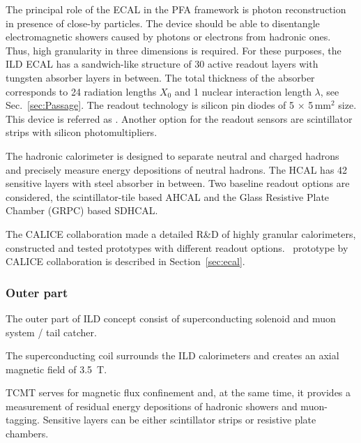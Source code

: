 The principal role of the ECAL in the PFA framework is photon reconstruction in presence of close-by particles. The device should be able to disentangle electromagnetic showers caused by photons or electrons from hadronic ones. Thus, high granularity in three dimensions is required. For these purposes, the ILD ECAL has a sandwich-like structure of 30 active readout layers with tungsten absorber layers in between. The total thickness of the absorber corresponds to 24 radiation lengths $X_0$ and 1 nuclear interaction length $\lambda$, see Sec.~\ref{sec:Passage}. The readout technology is silicon pin diodes of 5 $\times$ 5\,mm$^2$ size. This device is referred as \ecal. Another option for the readout sensors are scintillator strips with silicon photomultipliers.

The hadronic calorimeter is designed to separate neutral and charged hadrons and precisely measure energy depositions of neutral hadrons. The HCAL has 42 sensitive layers with steel absorber in between. Two baseline readout options are considered, the scintillator-tile based AHCAL and the Glass Resistive Plate Chamber (GRPC) based SDHCAL.

The CALICE collaboration made a detailed R\&D of highly granular calorimeters, constructed and tested prototypes with different readout options. 
\ecal\ prototype by CALICE collaboration is described in Section~\ref{sec:ecal}.


\subsubsection{Outer part}

The outer part of ILD concept consist of superconducting solenoid and muon system / tail catcher. 

The superconducting coil surrounds the ILD calorimeters and creates an axial magnetic field of 3.5~T.

TCMT serves for magnetic flux confinement and, at the same time, it provides a measurement of residual energy depositions of hadronic showers and muon-tagging. Sensitive layers can be either scintillator strips or resistive plate chambers. 


